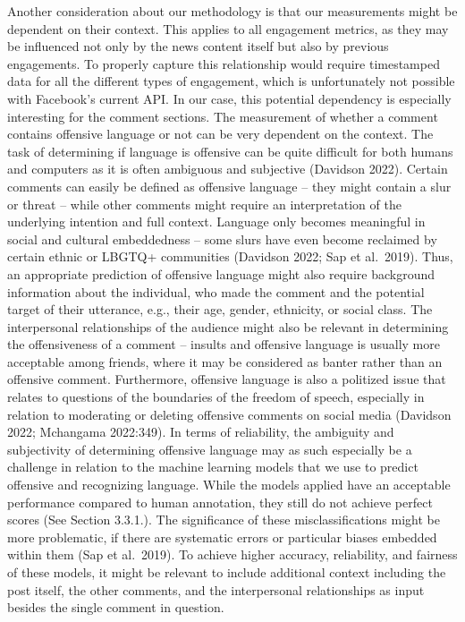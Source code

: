 \documentclass[
]{article}
\begin{document}
\noindent Another consideration about our methodology is that our
measurements might be dependent on their context. This applies to all
engagement metrics, as they may be influenced not only by the news
content itself but also by previous engagements. To properly capture
this relationship would require timestamped data for all the different
types of engagement, which is unfortunately not possible with Facebook's
current API. In our case, this potential dependency is especially
interesting for the comment sections. The measurement of whether a
comment contains offensive language or not can be very dependent on the
context. The task of determining if language is offensive can be quite
difficult for both humans and computers as it is often ambiguous and
subjective (Davidson 2022). Certain comments can easily be defined as
offensive language -- they might contain a slur or threat -- while other
comments might require an interpretation of the underlying intention and
full context. Language only becomes meaningful in social and cultural
embeddedness -- some slurs have even become reclaimed by certain ethnic
or LBGTQ+ communities (Davidson 2022; Sap et al.~2019). Thus, an
appropriate prediction of offensive language might also require
background information about the individual, who made the comment and
the potential target of their utterance, e.g., their age, gender,
ethnicity, or social class. The interpersonal relationships of the
audience might also be relevant in determining the offensiveness of a
comment -- insults and offensive language is usually more acceptable
among friends, where it may be considered as banter rather than an
offensive comment. Furthermore, offensive language is also a politized
issue that relates to questions of the boundaries of the freedom of
speech, especially in relation to moderating or deleting offensive
comments on social media (Davidson 2022; Mchangama 2022:349). In terms
of reliability, the ambiguity and subjectivity of determining offensive
language may as such especially be a challenge in relation to the
machine learning models that we use to predict offensive and recognizing
language. While the models applied have an acceptable performance
compared to human annotation, they still do not achieve perfect scores
(See Section 3.3.1.). The significance of these misclassifications might
be more problematic, if there are systematic errors or particular biases
embedded within them (Sap et al.~2019). To achieve higher accuracy,
reliability, and fairness of these models, it might be relevant to
include additional context including the post itself, the other
comments, and the interpersonal relationships as input besides the
single comment in question.
\end{document}
